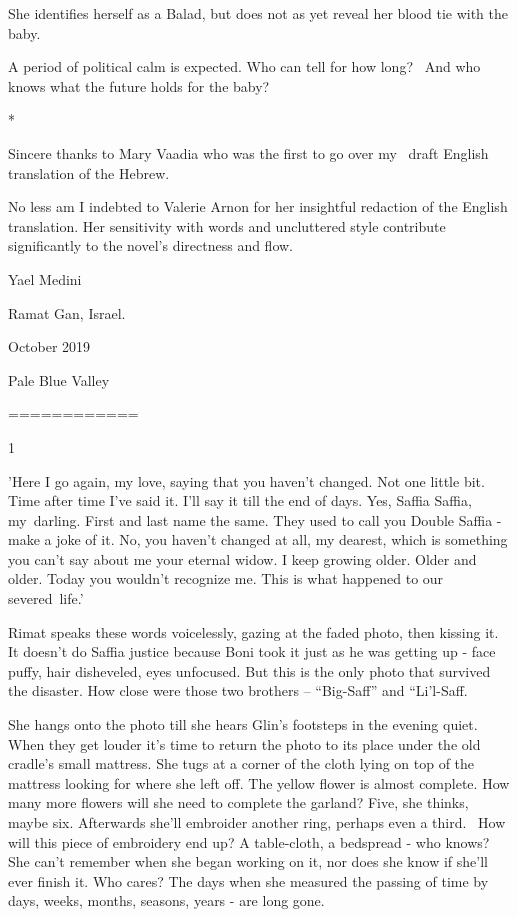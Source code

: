 \documentclass[12pt]{book}
\begin{document}
{She identifies herself as a Balad, but does not as yet reveal her
blood tie with the baby.}

{A period of political calm is expected. Who can tell for how long?
\ And who knows what the future holds for the baby? }


\bigskip

*

Sincere thanks to Mary Vaadia who was the first to go over my \ draft English translation of the Hebrew.


\bigskip

No less am I indebted to Valerie Arnon for her insightful redaction of the English translation. Her sensitivity with
words and uncluttered style contribute significantly to the novel's directness and flow.


\bigskip

Yael Medini

Ramat Gan, Israel.

October 2019


\bigskip

\clearpage
Pale Blue Valley

============


\bigskip


\bigskip

{1}

{{}'Here I go }again, my
love,{ saying that you haven't changed. Not one little
bit}{. }{Time after time I've said it. I'll say it till
the end of days. Yes, Saffia Saffia, my~darling. First and last name the same. }They used to call you Double Saffia -
make a joke of it.{ No,
you}\textit{{
}}{haven't changed }at all,
{my dearest, }which is something you
{can't say about me your
}eternal{ widow. I keep growing older. Older and older.
}Today{ you wouldn't recognize me. This is what happened to our
severed~life.'}

Rimat speaks these words voicelessly, gazing at the faded photo, then kissing it.
It{ doesn't do Saffia}{
}{justice because Boni took it }just as he was getting up - face
puffy, hair disheveled,{
}{eyes unfocused. But this is the only photo that survived }the
disaster{. How close were those two brothers -- }{}``Big-Saff'' and
``Li'l-Saff{\textquotedbl}.

S{he hangs onto the photo till she hears Glin's footsteps in the
evening quiet. When }they get louder {it's time to return the photo to
its place under the old cradle's }small{ mattress. She tugs at a
corner of the}{ }cloth lying on top of the
mattress{ looking for where she left off. The yellow flower is almost
complete. How many more flowers will she need} {to complete the
garland? Five, she }thinks{, maybe six. Afterwards she'll embroider
another }ring, p{erhaps even a third.~
}How{ will this piece of embroidery end
}up?{ }A{
table-cloth,} a {bedspread - who knows? She can't remember when she
began working on }it, nor does she know if she'll {ever finish it. Who
cares? }The days when she measured the passing of time by days, weeks, months, seasons, years - are long gone.
\end{document}
